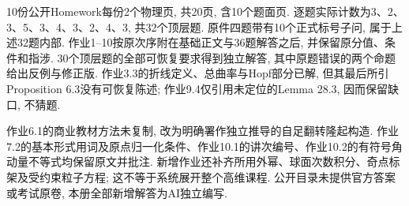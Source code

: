 \par{}
10份公开Homework每份2个物理页, 共20页, 含10个题面页. 逐题实际计数为3、2、3、5、3、4、3、2、4、3, 共32个顶层题. 原件四题带有10个正式标号子问, 属于上述32题内部. 作业1--10按原次序附在基础正文与36题解答之后, 并保留原分值、条件和指涉. 30个顶层题的全部可恢复要求得到独立解答, 其中原题错误的两个命题给出反例与修正版. 作业3.3的折线定义、总曲率与Hopf部分已解, 但其最后所引Proposition 6.3没有可恢复陈述; 作业9.4仅引用未定位的Lemma 28.3, 因而保留缺口, 不猜题.

作业6.1的商业教材方法未复制, 改为明确署作独立推导的自足翻转隆起构造. 作业7.2的基本形式用词及原点归一化条件、作业10.1的讲次编号、作业10.2的有符号角动量不等式均保留原文并批注. 新增作业还补齐所用外幂、球面次数积分、奇点标架及受约束粒子方程; 这不等于系统展开整个高维课程. 公开目录未提供官方答案或考试原卷, 本册全部新增解答为AI独立编写.
